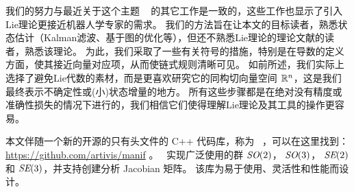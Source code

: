 我们的努力与最近关于这个主题 ~\cite{BARFOOT-17-Estimation,EADE-Lie,forster2017-TRO} 的其它工作是一致的，这些工作也显示了引入Lie理论更接近机器人学专家的需求。
我们的方法旨在让本文的目标读者，熟悉状态估计（Kalman滤波、基于图的优化等），但还不熟悉Lie理论的理论文献的读者，熟悉该理论。
%
为此，我们采取了一些有关符号的措施，特别是在导数的定义方面，使其接近向量对应项，从而使链式规则清晰可见。
如前所述，我们实际上选择了避免Lie代数的素材，而是更喜欢研究它的同构切向量空间 ${\mathbb R}^n$，这是我们最终表示不确定性或(小)状态增量的地方。
所有这些步骤都是在绝对没有精度或准确性损失的情况下进行的，我们相信它们使得理解Lie理论及其工具的操作更容易。

本文伴随一个新的开源的只有头文件的 C++ 代码库，称为 \manif\ \cite{DERAY-20-manif}，可以在这里找到： \url{https://github.com/artivis/manif} 。
\manif\ 实现广泛使用的群 $\textit{SO}(2)$， $\textit{SO}(3)$， $\textit{SE}(2)$ 和 $\textit{SE}(3)$，并支持创建分析 Jacobian 矩阵。
该库为易于使用、灵活性和性能而设计。


